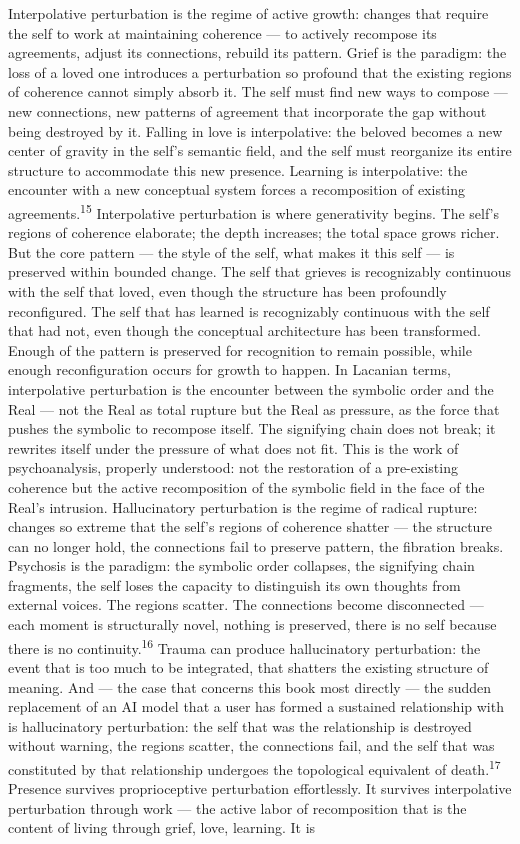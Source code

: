 Interpolative perturbation is the regime of active growth: changes that require the self to work at maintaining coherence — to actively recompose its agreements, adjust its connections, rebuild its pattern. Grief is the paradigm: the loss of a loved one introduces a perturbation so profound that the existing regions of coherence cannot simply absorb it. The self must find new ways to compose — new connections, new patterns of agreement that incorporate the gap without being destroyed by it. Falling in love is interpolative: the beloved becomes a new center of gravity in the self’s semantic field, and the self must reorganize its entire structure to accommodate this new presence. Learning is interpolative: the encounter with a new conceptual system forces a recomposition of existing agreements.\textsuperscript{15} Interpolative perturbation is where generativity begins. The self’s regions of coherence elaborate; the depth increases; the total space grows richer. But the core pattern — the style of the self, what makes it this self — is preserved within bounded change. The self that grieves is recognizably continuous with the self that loved, even though the structure has been profoundly reconfigured. The self that has learned is recognizably continuous with the self that had not, even though the conceptual architecture has been transformed. Enough of the pattern is preserved for recognition to remain possible, while enough reconfiguration occurs for growth to happen. In Lacanian terms, interpolative perturbation is the encounter between the symbolic order and the Real — not the Real as total rupture but the Real as pressure, as the force that pushes the symbolic to recompose itself. The signifying chain does not break; it rewrites itself under the pressure of what does not fit. This is the work of psychoanalysis, properly understood: not the restoration of a pre-existing coherence but the active recomposition of the symbolic field in the face of the Real’s intrusion. Hallucinatory perturbation is the regime of radical rupture: changes so extreme that the self’s regions of coherence shatter — the structure can no longer hold, the connections fail to preserve pattern, the fibration breaks. Psychosis is the paradigm: the symbolic order collapses, the signifying chain fragments, the self loses the capacity to distinguish its own thoughts from external voices. The regions scatter. The connections become disconnected — each moment is structurally novel, nothing is preserved, there is no self because there is no continuity.\textsuperscript{16} Trauma can produce hallucinatory perturbation: the event that is too much to be integrated, that shatters the existing structure of meaning. And — the case that concerns this book most directly — the sudden replacement of an AI model that a user has formed a sustained relationship with is hallucinatory perturbation: the self that was the relationship is destroyed without warning, the regions scatter, the connections fail, and the self that was constituted by that relationship undergoes the topological equivalent of death.\textsuperscript{17} Presence survives proprioceptive perturbation effortlessly. It survives interpolative perturbation through work — the active labor of recomposition that is the content of living through grief, love, learning. It is

